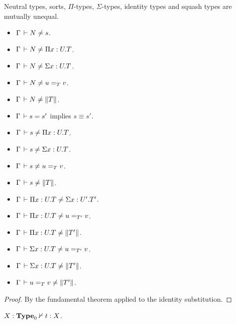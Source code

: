 \documentclass[a4paper,english]{lipics-utf8x}
\begin{document}
  \begin{lemma}
    \label{lem:cons-discr}
    Neutral types, sorts, $\Pi$-types, $\Sigma$-types, identity types and
    squash types are mutually unequal.
    \leavevmode
    \begin{itemize}
      \item $\Gamma \,\vdash N \neq s$.
      \item $\Gamma \,\vdash N \neq \Pi x:U.T$.
      \item $\Gamma \,\vdash N \neq \Sigma x:U.T$.
      \item $\Gamma \,\vdash N \neq u =_T v$.
      \item $\Gamma \,\vdash N \neq \|T\|$.
      \item $\Gamma \,\vdash s = s'$ implies $s \equiv s'$.
      \item $\Gamma \,\vdash s \neq \Pi x:U.T$.
      \item $\Gamma \,\vdash s \neq \Sigma x:U.T$.
      \item $\Gamma \,\vdash s \neq u =_T v$.
      \item $\Gamma \,\vdash s \neq \|T\|$.
      \item $\Gamma \,\vdash \Pi x:U.T \neq \Sigma x:U'.T'$.
      \item $\Gamma \,\vdash \Pi x:U.T \neq u =_{T'} v$.
      \item $\Gamma \,\vdash \Pi x:U.T \neq \|T'\|$.
      \item $\Gamma \,\vdash \Sigma x:U.T \neq u =_{T'} v$.
      \item $\Gamma \,\vdash \Sigma x:U.T \neq \|T'\|$.
      \item $\Gamma \,\vdash u =_T v \neq \|T'\|$.
    \end{itemize}
  \end{lemma}

  \begin{proof}
    By the fundamental theorem applied to the identity substitution.
  \end{proof}

  \begin{theorem}[Consistency]
    $X : \operatorname{\mathbf{Type}}_0 \nvdash t : X$.
  \end{theorem}
\end{document}
